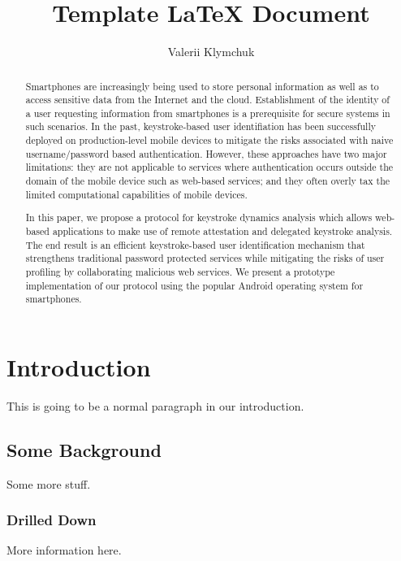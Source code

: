 \documentclass[twocolumn]{article}
\begin{document}
\title{Template  LaTeX Document}
\author{Valerii Klymchuk}
\maketitle

\begin{abstract}
Smartphones are increasingly being used to store personal information as well as to access sensitive data from the Internet and the cloud. Establishment of the identity of a user requesting information from smartphones is a prerequisite for  secure systems in such scenarios. In the past, keystroke-based user identifiation has been successfully deployed on production-level mobile devices to mitigate the risks associated with naive username/password based authentication. However, these approaches have two major limitations: they are not applicable to services where authentication occurs outside the domain of the mobile
device such as web-based services; and they often overly tax the limited computational capabilities of mobile devices.

In this paper, we propose a protocol for keystroke dynamics analysis which allows web-based applications to make use of remote attestation and delegated keystroke analysis. The end result is an efficient keystroke-based user identification mechanism that strengthens traditional password protected services
while mitigating the risks of user profiling by collaborating malicious web
services. We present a prototype implementation of our protocol using
the popular Android operating system for smartphones.
\end{abstract}

\section{Introduction} 
This is going to be a normal paragraph in our introduction. 


\subsection{Some Background} 
Some more stuff. 

\subsubsection{Drilled Down}\label{sec:drilled-down}
More information here. 
\end{document}
